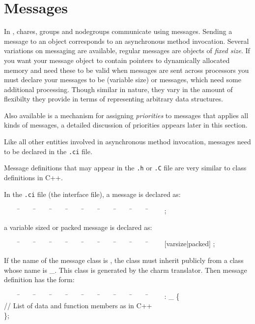 \section{Messages}

In \charmpp, chares, groups and 
nodegroups communicate using 
messages. Sending a message  to an object corresponds to an 
asynchronous method invocation.
Several variations on messaging are available, regular \charmpp messages are 
objects of \textit{fixed size}. If you want your message object to contain 
pointers to dynamically allocated memory and need these to be valid when 
messages are sent across processors you must declare your messages to be 
 (variable size) or  messages, which need some 
additional processing. Though similar in nature, they vary in the amount 
of flexibilty they provide in terms of representing arbitrary data structures.
 
Also available is a mechanism for assigning \textit{priorities} to messages 
that applies all kinds of messages, a detailed discussion
of priorities appears later in this section.

Like all 
other entities involved in asynchronous method invocation, messages need to be
declared in the {\tt .ci} file.

Message definitions that may appear in the {\tt .h} or {\tt .C} file are very 
similar to class definitions in C++.

In the {\tt .ci} file (the interface file), a message is declared as: 

\begin{tabbing}
~~~~ \=~~~~ \=~~~~ \=~~~~ \=~~~~ \=~~~~ \=~~~~ \=~~~~ \=~~~~ \=~~~~ \kill
\>  ;
\end{tabbing}

a variable sized or packed message is declared as:

\begin{tabbing}
~~~~ \=~~~~ \=~~~~ \=~~~~ \=~~~~ \=~~~~ \=~~~~ \=~~~~ \=~~~~ \=~~~~ \kill
\>  [varsize|packed] ;
\end{tabbing}


If the name of the message class is , the class must inherit 
publicly from a class whose name is \_. This class
is generated by the charm translator. Then message definition has the form:

\begin{tabbing}
~~~~ \=~~~~ \=~~~~ \=~~~~ \=~~~~ \=~~~~ \=~~~~ \=~~~~ \=~~~~ \=~~~~ \kill
\>   : \_ \{ \\
\> \>  // List of data and function members as in C++ \\
\> \};
\end{tabbing}


